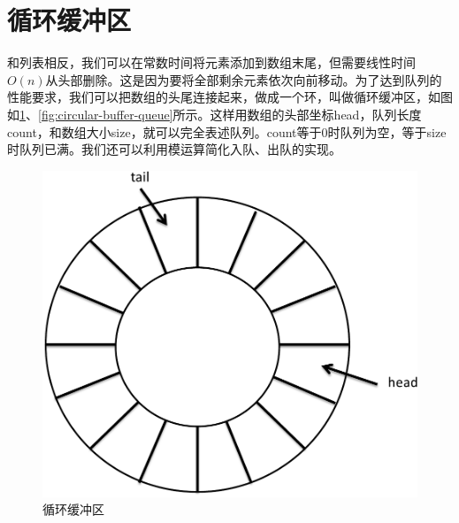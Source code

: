 \documentclass[b5paper]{ctexart}
\begin{document}
\section{循环缓冲区}

和列表相反，我们可以在常数时间将元素添加到数组末尾，但需要线性时间$O(n)$从头部删除。这是因为要将全部剩余元素依次向前移动。为了达到队列的性能要求，我们可以把数组的头尾连接起来，做成一个环，叫做循环缓冲区，如图如\cref{fig:circular-buffer}、\cref{fig:circular-buffer-queue}所示。这样用数组的头部坐标head，队列长度count，和数组大小size，就可以完全表述队列。count等于0时队列为空，等于size时队列已满。我们还可以利用模运算简化入队、出队的实现。

\begin{figure}[htbp]
 \centering
 \includegraphics[scale=0.3]{img/ring-buffer}
 \caption{循环缓冲区}
 \label{fig:circular-buffer}
\end{figure}
\end{document}
